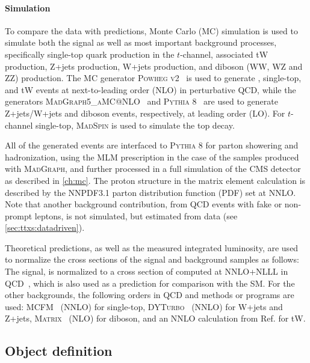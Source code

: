 \paragraph{Simulation}
To compare the data with predictions, Monte Carlo (MC) simulation is used to simulate both the \ttbar signal as well as most important background processes, specifically single-top quark production in the $t$-channel, associated tW production, Z+jets production, W+jets production, and diboson (WW, WZ and ZZ) production. The MC generator \textsc{Powheg v2}~\cite{Powheg:2004, Powheg:2007, Powheg:2010} is used to generate \ttbar, single-top, and tW events at next-to-leading order (NLO) in perturbative QCD, while the generators \textsc{MadGraph5\_aMC@NLO}~\cite{MG5aMCatNLO:2014} and \textsc{Pythia 8}~\cite{Pythia:2015} are used to generate Z+jets/W+jets and diboson events, respectively, at leading order (LO). For $t$-channel single-top, \textsc{MadSpin} is used to simulate the top decay.

All of the generated events are interfaced to \textsc{Pythia 8} for parton showering and hadronization, using the MLM prescription in the case of the samples produced with \textsc{MadGraph}, and further processed in a full simulation of the CMS detector as described in \cref{ch:mc}. The proton structure in the matrix element calculation is described by the NNPDF3.1 parton distribution function (PDF) set at NNLO. Note that another background contribution, from QCD events with fake or non-prompt leptons, is not simulated, but estimated from data (see \cref{sec:ttxs:datadriven}).

Theoretical predictions, as well as the measured integrated luminosity, are used to normalize the cross sections of the signal and background samples as follows: The \ttbar signal, is normalized to a cross section of \xsecpred computed at NNLO+NLLL in QCD~\cite{Czakon:2011xx}, which is also used as a prediction for comparison with the SM. For the other backgrounds, the following orders in QCD and methods or programs are used: \textsc{MCFM}~\cite{Campbell:2020fhf} (NNLO) for single-top, \textsc{DYTurbo}~\cite{Camarda:2019zyx} (NNLO) for W+jets and Z+jets, \textsc{Matrix}~\cite{Grazzini:2017mhc} (NLO) for diboson, and an NNLO calculation from Ref. \cite{Kidonakis:2021vob} for tW.


\subsection{Object definition}
\label{sec:ttxs:objects}

